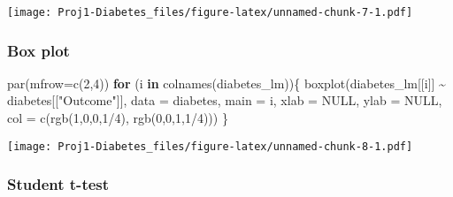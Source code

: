 \documentclass[
]{article}
\newenvironment{Shaded}{\begin{snugshade}}{\end{snugshade}}
\newcommand{\AttributeTok}[1]{\textcolor[rgb]{0.77,0.63,0.00}{#1}}
\newcommand{\ConstantTok}[1]{\textcolor[rgb]{0.00,0.00,0.00}{#1}}
\newcommand{\ControlFlowTok}[1]{\textcolor[rgb]{0.13,0.29,0.53}{\textbf{#1}}}
\newcommand{\DecValTok}[1]{\textcolor[rgb]{0.00,0.00,0.81}{#1}}
\newcommand{\FloatTok}[1]{\textcolor[rgb]{0.00,0.00,0.81}{#1}}
\newcommand{\FunctionTok}[1]{\textcolor[rgb]{0.00,0.00,0.00}{#1}}
\newcommand{\NormalTok}[1]{#1}
\newcommand{\OtherTok}[1]{\textcolor[rgb]{0.56,0.35,0.01}{#1}}
\newcommand{\SpecialCharTok}[1]{\textcolor[rgb]{0.00,0.00,0.00}{#1}}
\newcommand{\StringTok}[1]{\textcolor[rgb]{0.31,0.60,0.02}{#1}}
\begin{document}
\texttt{[image: Proj1-Diabetes\_files/figure-latex/unnamed-chunk-7-1.pdf]}

\hypertarget{box-plot}{%
\subsubsection{Box plot}\label{box-plot}}

\begin{Shaded}
\begin{Highlighting}[]
\FunctionTok{par}\NormalTok{(}\AttributeTok{mfrow=}\FunctionTok{c}\NormalTok{(}\DecValTok{2}\NormalTok{,}\DecValTok{4}\NormalTok{))}
\ControlFlowTok{for}\NormalTok{ (i }\ControlFlowTok{in} \FunctionTok{colnames}\NormalTok{(diabetes\_lm))\{}
  \FunctionTok{boxplot}\NormalTok{(diabetes\_lm[[i]] }\SpecialCharTok{\textasciitilde{}}\NormalTok{ diabetes[[}\StringTok{"Outcome"}\NormalTok{]], }\AttributeTok{data =}\NormalTok{ diabetes, }\AttributeTok{main =}\NormalTok{ i, }\AttributeTok{xlab =} \ConstantTok{NULL}\NormalTok{, }\AttributeTok{ylab =} \ConstantTok{NULL}\NormalTok{, }\AttributeTok{col =} \FunctionTok{c}\NormalTok{(}\FunctionTok{rgb}\NormalTok{(}\DecValTok{1}\NormalTok{,}\DecValTok{0}\NormalTok{,}\DecValTok{0}\NormalTok{,}\DecValTok{1}\SpecialCharTok{/}\DecValTok{4}\NormalTok{), }\FunctionTok{rgb}\NormalTok{(}\DecValTok{0}\NormalTok{,}\DecValTok{0}\NormalTok{,}\DecValTok{1}\NormalTok{,}\DecValTok{1}\SpecialCharTok{/}\DecValTok{4}\NormalTok{)))}
\NormalTok{\}}
\end{Highlighting}
\end{Shaded}

\texttt{[image: Proj1-Diabetes\_files/figure-latex/unnamed-chunk-8-1.pdf]}

\hypertarget{student-t-test}{%
\subsubsection{Student t-test}\label{student-t-test}}

\begin{Shaded}
\end{Shaded}
\end{document}

